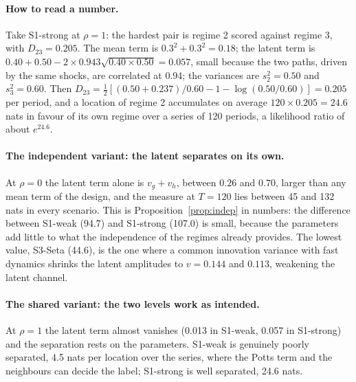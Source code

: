 \documentclass[11pt]{article}
\begin{document}
\paragraph{How to read a number.} Take S1-strong at $\rho = 1$: the hardest pair is regime 2 scored against regime 3, with $D_{23} = 0.205$. The mean term is $0.3^2 + 0.3^2 = 0.18$; the latent term is $0.40 + 0.50 - 2 \times 0.943 \sqrt{0.40 \times 0.50} = 0.057$, small because the two paths, driven by the same shocks, are correlated at 0.94; the variances are $s^2_2 = 0.50$ and $s^2_3 = 0.60$. Then $D_{23} = \tfrac12[(0.50 + 0.237)/0.60 - 1 - \log(0.50/0.60)] = 0.205$ per period, and a location of regime 2 accumulates on average $120 \times 0.205 = 24.6$ nats in favour of its own regime over a series of 120 periods, a likelihood ratio of about $e^{24.6}$.

\paragraph{The independent variant: the latent separates on its own.} At $\rho = 0$ the latent term alone is $v_g + v_h$, between $0.26$ and $0.70$, larger than any mean term of the design, and the measure at $T = 120$ lies between 45 and 132 nats in every scenario. This is Proposition~\ref{prop:indep} in numbers: the difference between S1-weak (94.7) and S1-strong (107.0) is small, because the parameters add little to what the independence of the regimes already provides. The lowest value, S3-Seta (44.6), is the one where a common innovation variance with fast dynamics shrinks the latent amplitudes to $v = 0.144$ and $0.113$, weakening the latent channel.

\paragraph{The shared variant: the two levels work as intended.} At $\rho = 1$ the latent term almost vanishes (0.013 in S1-weak, 0.057 in S1-strong) and the separation rests on the parameters. S1-weak is genuinely poorly separated, 4.5 nats per location over the series, where the Potts term and the neighbours can decide the label; S1-strong is well separated, 24.6 nats.
\end{document}
